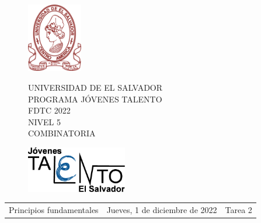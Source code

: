 \documentclass[10pt]{article}
\newcommand{\tema}{Principios fundamentales}
\newcommand{\fecha}{Jueves, 1 de diciembre de 2022}
\newcommand{\sesion}{Tarea 2}
\begin{document}
\thispagestyle{empty}

\begin{figure}[h] 
	\begin{minipage}[b]{0.26\textwidth}
		\begin{center}
			\includegraphics[height=3cm]{Logos/UES.png}
			\par\end{center}
	\end{minipage} 
	\begin{minipage}[b]{0.46\textwidth}
		\begin{center}
			UNIVERSIDAD DE EL SALVADOR\\ [0.1cm]
			PROGRAMA JÓVENES TALENTO\\ [0.1cm]
	        FDTC 2022\\ [0.1cm]
                NIVEL 5\\ [0.1cm]
			COMBINATORIA 
			\par\end{center}
	\end{minipage} 
	\begin{minipage}[b]{0.05\textwidth}
		\begin{center}
			\includegraphics[height=2cm]{Logos/LOGO PJT.png}
			\par\end{center}
	\end{minipage}
\end{figure}

\begin{center}
    \begin{tabular}{p{4.5cm} p{7cm} p{4.5cm}}
        \tema & \centering\fecha & \hfill\sesion
    \end{tabular}
\end{center}
\end{document}
